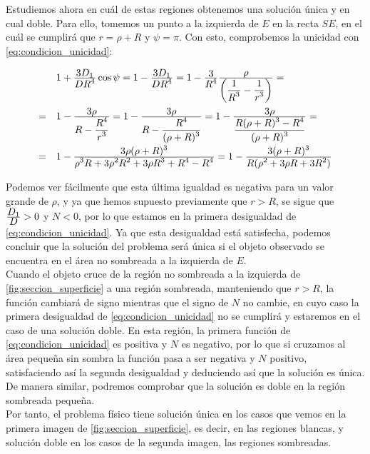 Estudiemos ahora en cuál de estas regiones obtenemos una solución única y en cual doble. Para ello, tomemos un punto a la izquierda de $E$ en la recta $SE$, en el cuál se cumplirá que $r=\rho+R$ y $\psi=\pi$. Con esto, comprobemos la unicidad con \eqref{eq:condicion_unicidad}:
\[
\def\arraystretch{2}
\begin{array}{ll}
  & 1+\ddfrac{3D_1}{DR^4}\cos{\psi} = 1-\ddfrac{3D_1}{DR^4} = 1-\ddfrac{3}{R^4}\ddfrac{\rho}{\left(\ddfrac{1}{R^3}-\ddfrac{1}{r^3}\right)} = \\
= & 1-\ddfrac{3\rho}{R-\ddfrac{R^4}{r^3}} = 1-\ddfrac{3\rho}{R-\ddfrac{R^4}{(\rho+R)^3}} = 1-\ddfrac{3\rho}{\ddfrac{R(\rho+R)^3-R^4}{(\rho+R)^3}} = \\
= & 1-\ddfrac{3\rho(\rho+R)^3}{\rho^3R+3\rho^2R^2+3\rho R^3+R^4-R^4} = 1-\ddfrac{3(\rho+R)^3}{R(\rho^2+3\rho R+3R^2)}
\end{array}
\]

Podemos ver fácilmente que esta última igualdad es negativa para un valor grande de $\rho$, y ya que hemos supuesto previamente que $r>R$, se sigue que $\frac{\displaystyle D_1}{\displaystyle D}>0$ y $N<0$, por lo que estamos en la primera desigualdad de \eqref{eq:condicion_unicidad}. Ya que esta desigualdad está satisfecha, podemos concluir que la solución del problema será única si el objeto observado se encuentra en el área no sombreada a la izquierda de $E$.\\

Cuando el objeto cruce de la región no sombreada a la izquierda de \ref{fig:seccion_superficie} a una región sombreada, manteniendo que $r>R$, la función cambiará de signo mientras que el signo de $N$ no cambie, en cuyo caso la primera desigualdad de \eqref{eq:condicion_unicidad} no se cumplirá y estaremos en el caso de una solución doble. En esta región, la primera función de \eqref{eq:condicion_unicidad} es positiva y $N$ es negativo, por lo que si cruzamos al área pequeña sin sombra la función pasa a ser negativa y $N$ positivo, satisfaciendo así la segunda desigualdad y deduciendo así que la solución es única. De manera similar, podremos comprobar que la solución es doble en la región sombreada pequeña.\\

Por tanto, el problema físico tiene solución única en los casos que vemos en la primera imagen de \ref{fig:seccion_superficie}, es decir, en las regiones blancas, y solución doble en los casos de la segunda imagen, las regiones sombreadas.\\




